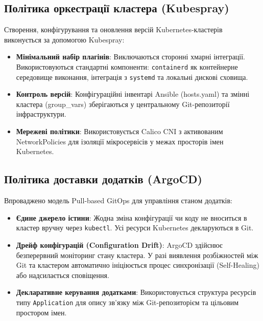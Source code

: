 \subsection{Політика оркестрації кластера (Kubespray)}
Створення, конфігурування та оновлення версій Kubernetes-кластерів виконується за допомогою Kubespray:
\begin{itemize}
    \item \textbf{Мінімальний набір плагінів}: Виключаються сторонні хмарні інтеграції. Використовуються стандартні компоненти: \texttt{containerd} як контейнерне середовище виконання, інтеграція з \texttt{systemd} та локальні дискові сховища.
    \item \textbf{Контроль версій}: Конфігураційні інвентарі Ansible (hosts.yaml) та змінні кластера (group\_vars) зберігаються у центральному Git-репозиторії інфраструктури.
    \item \textbf{Мережеві політики}: Використовується Calico CNI з активованим NetworkPolicies для ізоляції мікросервісів у межах просторів імен Kubernetes.
\end{itemize}

\subsection{Політика доставки додатків (ArgoCD)}
Впроваджено модель Pull-based GitOps для управління станом додатків:
\begin{itemize}
    \item \textbf{Єдине джерело істини}: Жодна зміна конфігурації чи коду не вноситься в кластер вручну через \texttt{kubectl}. Усі ресурси Kubernetes декларуються в Git.
    \item \textbf{Дрейф конфігурацій (Configuration Drift)}: ArgoCD здійснює безперервний моніторинг стану кластера. У разі виявлення розбіжностей між Git та кластером автоматично ініціюється процес синхронізації (Self-Healing) або надсилається сповіщення.
    \item \textbf{Декларативне керування додатками}: Використовується структура ресурсів типу \texttt{Application} для опису зв'язку між Git-репозиторієм та цільовим простором імен.
\end{itemize}

